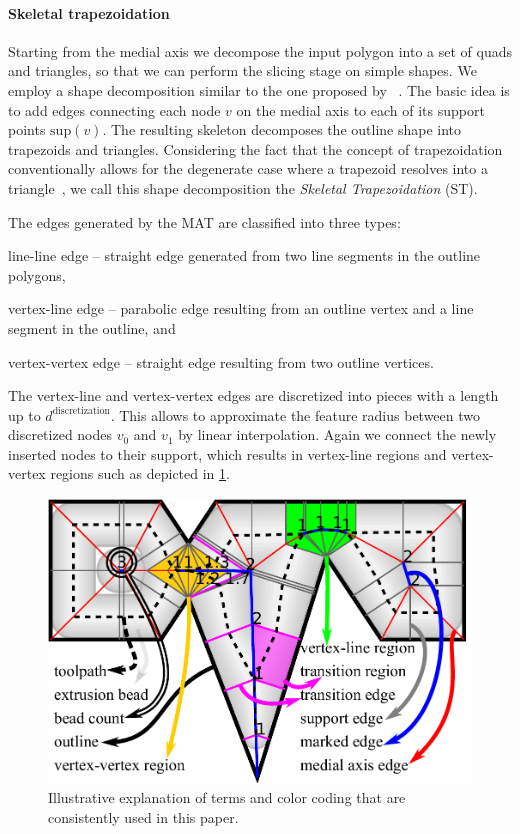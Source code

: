 \paragraph{Skeletal trapezoidation}
Starting from the medial axis we decompose the input polygon into a set of quads and triangles, so that we can perform the slicing stage on simple shapes.
We employ a shape decomposition similar to the one proposed by \citeauthor{Ding2016a}~\cite{Ding2016a}. 
The basic idea is to add edges connecting each node $v$ on the medial axis to each of its support points $\text{sup}(v)$. 
The resulting skeleton decomposes the outline shape into trapezoids and triangles.
Considering the fact that the concept of trapezoidation conventionally allows for the degenerate case where a trapezoid resolves into a triangle~\cite{chazelle1984,fournier1984}, we call this shape decomposition the \emph{Skeletal Trapezoidation} (ST).


The edges generated by the MAT are classified into three types:
\begin{enumerate*}
\item line-line edge -- straight edge generated from two line segments in the outline polygons,
\item vertex-line edge -- parabolic edge resulting from an outline vertex and a line segment in the outline, and 
\item vertex-vertex edge -- straight edge resulting from two outline vertices.
\end{enumerate*}
The vertex-line and vertex-vertex edges are discretized into pieces with a length up to $d^\text{discretization}$.
This allows to approximate the feature radius between two discretized nodes $v_0$ and $v_1$ by linear interpolation. 
Again we connect the newly inserted nodes to their support, which results in vertex-line regions and vertex-vertex regions such as depicted in \cref{legend}.



\begin{figure}\centering
\includegraphics[width=.75\columnwidth]{sources-method-legend2.pdf}
\caption{Illustrative explanation of terms and color coding that are consistently used in this paper.}
\label{legend}
\end{figure}




